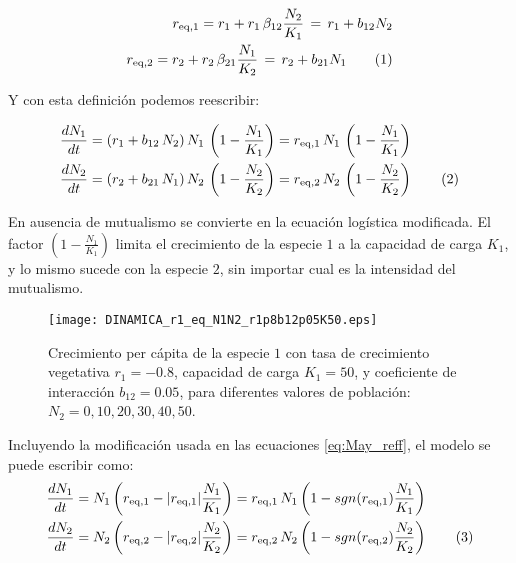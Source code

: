 \begin{align*}
\displaystyle r_{\rm{eq},1}=r_1 + r_1\, \beta_{12} \frac{N_2}{K_1}\, =\, r_1 + b_{12}N_2  \\
\displaystyle r_{\rm{eq},2}=r_2 + r_2\, \beta_{21} \frac{N_1}{K_2}\, =\, r_2 + b_{21}N_1 \stepcounter{equation}
\tag{\theequation}
\end{align*}

Y con esta definición podemos reescribir:

\begin{align*}
\displaystyle & \frac{dN_1}{dt}= (r_1 + b_{12}\, N_2) \, N_1\,\left(1-\frac{N_1}{K_1}\right)=r_{\rm{eq},1}\,N_1\,\left(1-\frac{N_1}{K_1}\right) \\
\displaystyle & \frac{dN_2}{dt}= (r_2 + b_{21}\, N_1) \, N_2\,\left(1-\frac{N_2}{K_2}\right)=r_{\rm{eq},2}\,N_2\,\left(1-\frac{N_2}{K_2}\right)
\stepcounter{equation}\tag{\theequation}
\label{eq:May_reff}
\end{align*}

En ausencia de mutualismo se convierte en la ecuación logística modificada. El factor $\left(1-\frac{N_{1}}{K_{1}}\right)$ limita el crecimiento de la especie $1$ a la capacidad de carga $K_{1}$, y lo mismo sucede con la especie $2$, sin importar cual es la intensidad del mutualismo.

\begin{figure}[t]
\centering
\texttt{[image: DINAMICA\_r1\_eq\_N1N2\_r1p8b12p05K50.eps]}
\caption{Crecimiento per cápita de la especie $1$ con tasa de crecimiento vegetativa $r_1=-0.8$, capacidad de carga $K_1=50$, y coeficiente de interacción $b_{12}=0.05$, para diferentes valores de población: $N_2=0,10,20,30,40,50$.}
\label{fig:per capita_growth_rate_mutualism}
\end{figure}

Incluyendo la modificación usada en las ecuaciones \ref{eq:May_reff}, el modelo se puede escribir como:
\begin{align*}
\displaystyle & \frac{dN_1}{dt}= N_{1} \left( r_{\rm{eq},1}- |r_{\rm{eq},1}| \frac{N_1}{K_1} \right) = r_{\rm{eq},1}\, N_1 \left(1-sgn(r_{\rm{eq},1})\frac{N_1}{K_1}\right)\\
\displaystyle & \frac{dN_2}{dt}= N_{2} \left( r_{\rm{eq},2}- |r_{\rm{eq},2}| \frac{N_2}{K_2} \right)= r_{\rm{eq},2}\, N_2 \left(1-sgn(r_{\rm{eq},2})\frac{N_2}{K_2}\right)
\stepcounter{equation}\tag{\theequation}\label{eq:new_model}
\end{align*}


